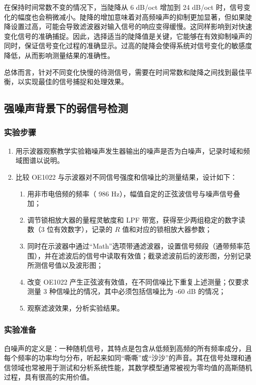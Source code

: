\documentclass[dvipsnames, svgnames,a4paper,11pt]{article}
\begin{document}
		在保持时间常数不变的情况下，当陡降从 6 dB/oct 增加到 24 dB/oct 时，信号变化的幅度也会稍微减小。陡降的增加意味着对高频噪声的抑制更加显著，但如果陡降设置过高，可能会导致滤波器对输入信号的响应变得缓慢。这同样影响到对快速变化信号的准确捕捉。因此，选择适当的陡降值是关键，它能够在有效抑制噪声的同时，保证信号变化过程的准确显示。过高的陡降会使得系统对信号变化的敏感度降低，从而影响测量结果的准确性。
		
		总体而言，针对不同变化快慢的待测信号，需要在时间常数和陡降之间找到最佳平衡，以实现最佳的信号捕捉和处理效果。
	\subsection{强噪声背景下的弱信号检测}
\subsubsection{实验步骤}
\begin{enumerate}
    \item 用示波器观察教学实验箱噪声发生器输出的噪声是否为白噪声，记录时域和频域图谱以说明。
    \item 比较 OE1022 与示波器对不同信号强度和信噪比的测量结果，设计如下：
    \begin{enumerate}
        \item 用非市电倍频的频率（ 986 Hz），幅值自定的正弦波信号与噪声信号叠加；
        \item 调节锁相放大器的量程灵敏度和 LPF 带宽，获得至少两组稳定的数字读数（3 位有效数字），记录的 \( R \) 值和对应的锁相放大器参数；
        \item 同时在示波器中通过“Math”选项带通滤波器，设置信号频段（通带频率范围），并在滤波后的信号中读取有效值；截录滤波前后的波形图，分别记录所测信号值以及波形图；
        \item 改变 OE1022 产生正弦波有效值，在不同信噪比下重复上述测量；仅要求测量 3 种信噪比的情况，其中必须包括信噪比为 -60 dB 的情况；
        \item 观察滤波效果，分析实验结果。
    \end{enumerate}
\end{enumerate}
\subsubsection{实验准备}
白噪声的定义是：一种随机信号，其特点是包含从低频到高频的所有频率成分，且每个频率的功率均匀分布，听起来如同“嘶嘶”或“沙沙”的声音。其在信号处理和通信领域也常被用于测试和分析系统性能，其数学模型通常被视为零均值的高斯随机过程，具有很高的实用价值。
\end{document}
